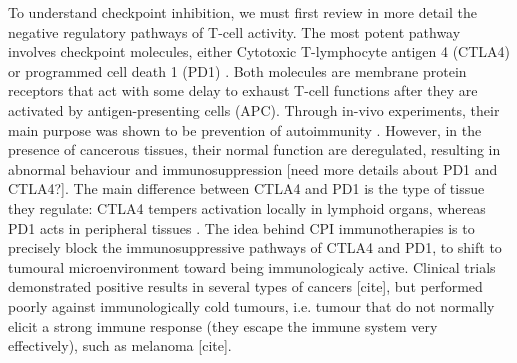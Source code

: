 \documentclass[11pt]{article}
\begin{document}
\par To understand checkpoint inhibition, we must first review in more detail the negative regulatory pathways of T-cell activity. The most potent pathway involves checkpoint molecules, either Cytotoxic T-lymphocyte antigen 4 (CTLA4) or programmed cell death 1 (PD1) \cite{cpiProof}. Both molecules are membrane protein receptors that act with some delay to exhaust T-cell functions after they are activated by antigen-presenting cells (APC). Through in-vivo experiments, their main purpose was shown to be prevention of autoimmunity \cite{PD1Autoimmune}. However, in the presence of cancerous tissues, their normal function are deregulated, resulting in abnormal behaviour and immunosuppression [need more details about PD1 and CTLA4?]. The main difference between CTLA4 and PD1 is the type of tissue they regulate: CTLA4 tempers activation locally in lymphoid organs, whereas PD1 acts in peripheral tissues \cite{PDvsCTLA}. The idea behind CPI immunotherapies is to precisely block the immunosuppressive pathways of CTLA4 and PD1, to shift to tumoural microenvironment toward being immunologicaly active. Clinical trials demonstrated positive results in several types of cancers [cite], but performed poorly against immunologically cold tumours, i.e. tumour that do not normally elicit a strong immune response (they escape the immune system very effectively), such as melanoma [cite].  

\end{document}
